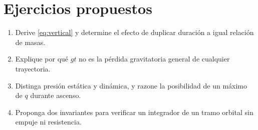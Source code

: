 \section{Ejercicios propuestos}
\begin{enumerate}
\item Derive \eqref{eq:vertical} y determine el efecto de duplicar duración a igual relación de masas.
\item Explique por qué $gt$ no es la pérdida gravitatoria general de cualquier trayectoria.
\item Distinga presión estática y dinámica, y razone la posibilidad de un máximo de $q$ durante ascenso.
\item Proponga dos invariantes para verificar un integrador de un tramo orbital sin empuje ni resistencia.
\end{enumerate}
